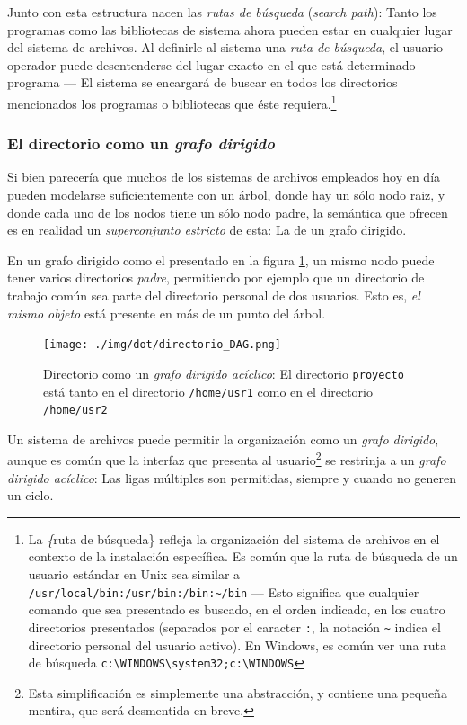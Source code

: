 \documentclass[11pt,fleqn]{book} %
\begin{document}
Junto con esta estructura nacen las \emph{rutas de búsqueda} (\emph{search path}): Tanto los programas como las bibliotecas de sistema ahora
pueden estar en cualquier lugar del sistema de archivos. Al definirle
al sistema una \emph{ruta de búsqueda}, el usuario operador puede
desentenderse del lugar exacto en el que está determinado programa —
El sistema se encargará de buscar en todos los directorios mencionados
los programas o bibliotecas que éste requiera.\footnote{La \emph\{ruta de
búsqueda\} refleja la organización del sistema de archivos en el
contexto de la instalación específica. Es común que la ruta de
búsqueda de un usuario estándar en Unix sea similar a
\texttt{/usr/local/bin:/usr/bin:/bin:\textasciitilde{}/bin} — Esto significa que cualquier
comando que sea presentado es buscado, en el orden indicado, en los
cuatro directorios presentados (separados por el caracter \texttt{:}, la
notación \texttt{\textasciitilde{}} indica el directorio personal del usuario activo). En
Windows, es común ver una ruta de búsqueda
\texttt{c:\textbackslash{}WINDOWS\textbackslash{}system32;c:\textbackslash{}WINDOWS} }
\subsubsection{El directorio como un \emph{grafo dirigido}}
\label{sec-6-3-1-5}
\label{DIR_grafo_dirigido}


Si bien parecería que muchos de los sistemas de archivos empleados
hoy en día pueden modelarse suficientemente con un árbol, donde hay un
sólo nodo raiz, y donde cada uno de los nodos tiene un sólo nodo
padre, la semántica que ofrecen es en realidad un \emph{superconjunto estricto} de esta: La de un grafo dirigido.

En un grafo dirigido como el presentado en la figura \ref{DIR_directorio_DAG}, un mismo nodo puede tener varios directorios
\emph{padre}, permitiendo por ejemplo que un directorio de trabajo común
sea parte del directorio personal de dos usuarios. Esto es, \emph{el mismo objeto} está presente en más de un punto del árbol.

\begin{figure}[htb]
\centering
\texttt{[image: ./img/dot/directorio\_DAG.png]}
\caption{\label{DIR_directorio_DAG}Directorio como un \emph{grafo dirigido acíclico}: El directorio \texttt{proyecto} está tanto en el directorio \texttt{/home/usr1} como en el directorio \texttt{/home/usr2}}
\end{figure}

Un sistema de archivos puede permitir la organización como un \emph{grafo dirigido}, aunque es común que la interfaz que presenta al
usuario\footnote{Esta simplificación es simplemente una abstracción, y
contiene una pequeña mentira, que será desmentida en breve. } se
restrinja a un \emph{grafo dirigido acíclico}: Las ligas múltiples son
permitidas, siempre y cuando no generen un ciclo.
\end{document}
